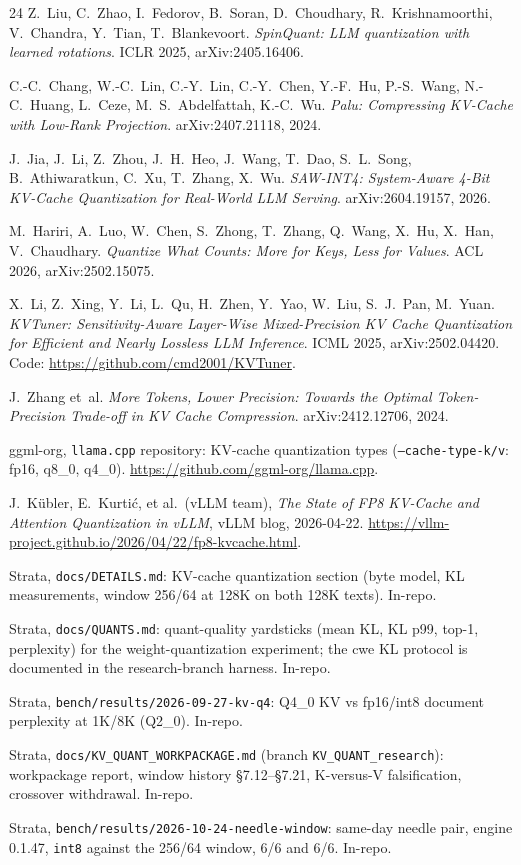 \documentclass[10pt,twocolumn]{article}
\begin{document}
\begin{thebibliography}{24}
Z.~Liu, C.~Zhao, I.~Fedorov, B.~Soran, D.~Choudhary, R.~Krishnamoorthi, V.~Chandra, Y.~Tian, T.~Blankevoort.
\emph{SpinQuant: LLM quantization with learned rotations}.
ICLR 2025, arXiv:2405.16406.

C.-C.~Chang, W.-C.~Lin, C.-Y.~Lin, C.-Y.~Chen, Y.-F.~Hu, P.-S.~Wang, N.-C.~Huang, L.~Ceze, M.~S.~Abdelfattah, K.-C.~Wu.
\emph{Palu: Compressing KV-Cache with Low-Rank Projection}.
arXiv:2407.21118, 2024.

J.~Jia, J.~Li, Z.~Zhou, J.~H.~Heo, J.~Wang, T.~Dao, S.~L.~Song, B.~Athiwaratkun, C.~Xu, T.~Zhang, X.~Wu.
\emph{SAW-INT4: System-Aware 4-Bit KV-Cache Quantization for Real-World LLM Serving}.
arXiv:2604.19157, 2026.

M.~Hariri, A.~Luo, W.~Chen, S.~Zhong, T.~Zhang, Q.~Wang, X.~Hu, X.~Han, V.~Chaudhary.
\emph{Quantize What Counts: More for Keys, Less for Values}.
ACL 2026, arXiv:2502.15075.

X.~Li, Z.~Xing, Y.~Li, L.~Qu, H.~Zhen, Y.~Yao, W.~Liu, S.~J.~Pan, M.~Yuan.
\emph{KVTuner: Sensitivity-Aware Layer-Wise Mixed-Precision KV Cache Quantization for Efficient and Nearly Lossless LLM Inference}.
ICML 2025, arXiv:2502.04420. Code: \url{https://github.com/cmd2001/KVTuner}.

J.~Zhang et~al.
\emph{More Tokens, Lower Precision: Towards the Optimal Token-Precision Trade-off in KV Cache Compression}.
arXiv:2412.12706, 2024.

ggml-org, \texttt{llama.cpp} repository:
KV-cache quantization types (\texttt{--cache-type-k/v}: fp16, q8\_0, q4\_0).
\url{https://github.com/ggml-org/llama.cpp}.

J.~K{\"u}bler, E.~Kurti{\'c}, et al.\ (vLLM team), \emph{The State of FP8 KV-Cache and Attention Quantization in vLLM}, vLLM blog, 2026-04-22.
\url{https://vllm-project.github.io/2026/04/22/fp8-kvcache.html}.

Strata, \texttt{docs/DETAILS.md}: KV-cache quantization section (byte model, KL measurements, window 256/64 at 128K on both 128K texts). In-repo.

Strata, \texttt{docs/QUANTS.md}: quant-quality yardsticks (mean KL, KL p99, top-1, perplexity) for the weight-quantization experiment; the cwe KL protocol is documented in the research-branch harness. In-repo.

Strata, \texttt{bench/results/2026-09-27-kv-q4}: Q4\_0 KV vs fp16/int8 document perplexity at 1K/8K (Q2\_0). In-repo.

Strata, \texttt{docs/KV\_QUANT\_WORKPACKAGE.md} (branch \texttt{KV\_QUANT\_research}): workpackage report, window history \S7.12--\S7.21, K-versus-V falsification, crossover withdrawal. In-repo.

Strata, \texttt{bench/results/2026-10-24-needle-window}: same-day needle pair, engine 0.1.47, \texttt{int8} against the 256/64 window, 6/6 and 6/6. In-repo.

\end{thebibliography}
\end{document}
